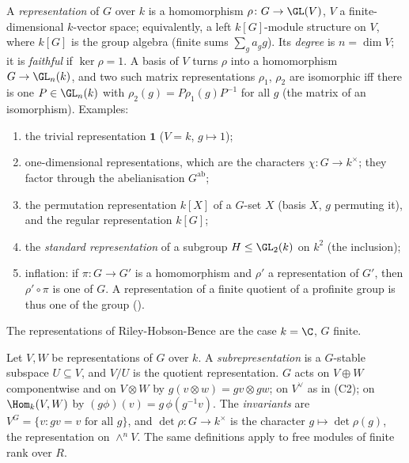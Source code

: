 \begin{definition}[Representations]\label{def:reps:representation}
A \emph{representation} of $G$ over $k$ is a homomorphism $\rho\colon G\to\GL(V)$, $V$ a finite-dimensional $k$-vector space; equivalently, a
left $k[G]$-module structure on $V$, where $k[G]$ is the group algebra (finite sums $\sum_ga_gg$). Its \emph{degree} is $n=\dim V$; it is
\emph{faithful} if $\ker\rho=1$. A basis of $V$ turns $\rho$ into a homomorphism $G\to\GL_n(k)$, and two such matrix representations $\rho_1$,
$\rho_2$ are isomorphic iff there is one $P\in\GL_n(k)$ with $\rho_2(g)=P\rho_1(g)P^{-1}$ for all $g$ (the matrix of an isomorphism).
Examples:
\begin{enumerate}[label=(\alph*)]
\item the trivial representation $\mathbf 1$ ($V=k$, $g\mapsto1$);
\item one-dimensional representations, which are the characters $\chi\colon G\to k^\times$; they factor through the abelianisation $G^{\mathrm{ab}}$;
\item the permutation representation $k[X]$ of a $G$-set $X$ (basis $X$, $g$ permuting it), and the regular representation $k[G]$;
\item the \emph{standard representation} of a subgroup $H\le\GL_2(k)$ on $k^2$ (the inclusion);
\item inflation: if $\pi\colon G\to G'$ is a homomorphism and $\rho'$ a representation of $G'$, then $\rho'\circ\pi$ is one of $G$. A representation
of a finite quotient of a profinite group is thus one of the group ().
\end{enumerate}
The representations of Riley-Hobson-Bence \cite{RHB06} are the case $k=\C$, $G$ finite.
\end{definition}

\begin{definition}[Constructions]\label{def:reps:constructions}
Let $V,W$ be representations of $G$ over $k$.
A \emph{subrepresentation} is a $G$-stable subspace $U\subseteq V$, and $V/U$ is the quotient representation. $G$ acts on $V\oplus W$
componentwise and on $V\otimes W$ by $g(v\otimes w)=gv\otimes gw$; on $V^\vee$ as in (C2); on $\Hom_k(V,W)$ by $(g\phi)(v)=g\,\phi(g^{-1}v)$.
The \emph{invariants} are $V^G=\{v:gv=v\text{ for all }g\}$, and $\det\rho\colon G\to k^\times$ is the character $g\mapsto\det\rho(g)$, the
representation on $\wedge^nV$. The same definitions apply to free modules of finite rank over $R$.
\end{definition}

